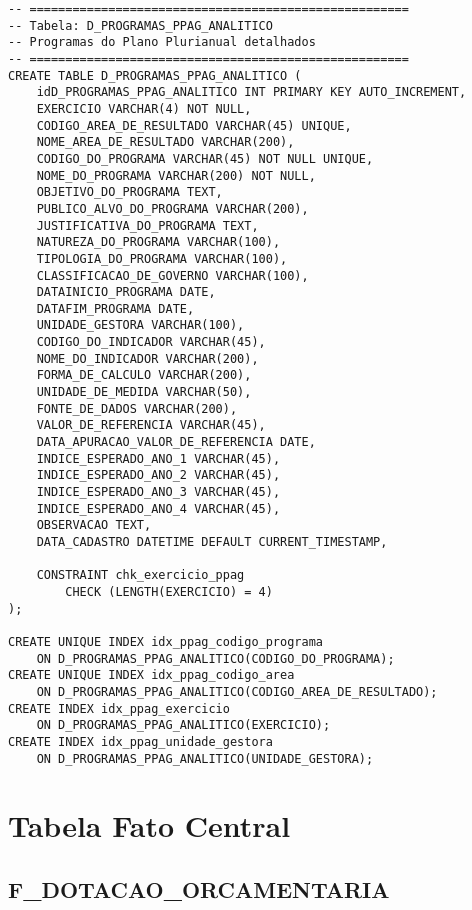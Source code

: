 \documentclass[12pt,a4paper]{article}
\begin{document}
\begin{lstlisting}
-- =====================================================
-- Tabela: D_PROGRAMAS_PPAG_ANALITICO
-- Programas do Plano Plurianual detalhados
-- =====================================================
CREATE TABLE D_PROGRAMAS_PPAG_ANALITICO (
    idD_PROGRAMAS_PPAG_ANALITICO INT PRIMARY KEY AUTO_INCREMENT,
    EXERCICIO VARCHAR(4) NOT NULL,
    CODIGO_AREA_DE_RESULTADO VARCHAR(45) UNIQUE,
    NOME_AREA_DE_RESULTADO VARCHAR(200),
    CODIGO_DO_PROGRAMA VARCHAR(45) NOT NULL UNIQUE,
    NOME_DO_PROGRAMA VARCHAR(200) NOT NULL,
    OBJETIVO_DO_PROGRAMA TEXT,
    PUBLICO_ALVO_DO_PROGRAMA VARCHAR(200),
    JUSTIFICATIVA_DO_PROGRAMA TEXT,
    NATUREZA_DO_PROGRAMA VARCHAR(100),
    TIPOLOGIA_DO_PROGRAMA VARCHAR(100),
    CLASSIFICACAO_DE_GOVERNO VARCHAR(100),
    DATAINICIO_PROGRAMA DATE,
    DATAFIM_PROGRAMA DATE,
    UNIDADE_GESTORA VARCHAR(100),
    CODIGO_DO_INDICADOR VARCHAR(45),
    NOME_DO_INDICADOR VARCHAR(200),
    FORMA_DE_CALCULO VARCHAR(200),
    UNIDADE_DE_MEDIDA VARCHAR(50),
    FONTE_DE_DADOS VARCHAR(200),
    VALOR_DE_REFERENCIA VARCHAR(45),
    DATA_APURACAO_VALOR_DE_REFERENCIA DATE,
    INDICE_ESPERADO_ANO_1 VARCHAR(45),
    INDICE_ESPERADO_ANO_2 VARCHAR(45),
    INDICE_ESPERADO_ANO_3 VARCHAR(45),
    INDICE_ESPERADO_ANO_4 VARCHAR(45),
    OBSERVACAO TEXT,
    DATA_CADASTRO DATETIME DEFAULT CURRENT_TIMESTAMP,
    
    CONSTRAINT chk_exercicio_ppag 
        CHECK (LENGTH(EXERCICIO) = 4)
);

CREATE UNIQUE INDEX idx_ppag_codigo_programa 
    ON D_PROGRAMAS_PPAG_ANALITICO(CODIGO_DO_PROGRAMA);
CREATE UNIQUE INDEX idx_ppag_codigo_area 
    ON D_PROGRAMAS_PPAG_ANALITICO(CODIGO_AREA_DE_RESULTADO);
CREATE INDEX idx_ppag_exercicio 
    ON D_PROGRAMAS_PPAG_ANALITICO(EXERCICIO);
CREATE INDEX idx_ppag_unidade_gestora 
    ON D_PROGRAMAS_PPAG_ANALITICO(UNIDADE_GESTORA);
\end{lstlisting}

\section{Tabela Fato Central}

\subsection{F\_DOTACAO\_ORCAMENTARIA}
\end{document}
